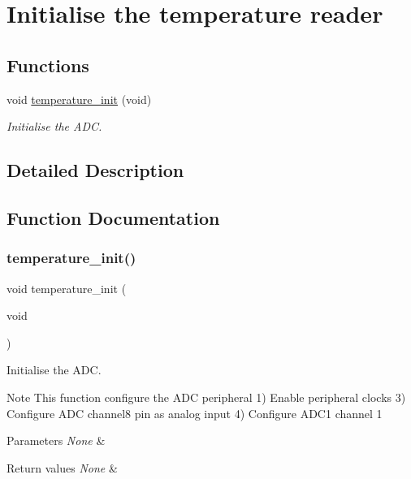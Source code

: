\hypertarget{group___temperature___init}{}\section{Initialise the temperature reader}
\label{group___temperature___init}
\subsection*{Functions}
\begin{DoxyCompactItemize}
\item 
void \hyperlink{group___temperature___init_ga7da890f6748bbeb05511fd20100cb6ef}{temperature\+\_\+init} (void)
\begin{DoxyCompactList}\small\item\em Initialise the A\+DC. \end{DoxyCompactList}\end{DoxyCompactItemize}


\subsection{Detailed Description}


\subsection{Function Documentation}
\mbox{\label{group___temperature___init_ga7da890f6748bbeb05511fd20100cb6ef}} 
\subsubsection{\texorpdfstring{temperature\+\_\+init()}{temperature\_init()}}
{\footnotesize\ttfamily void temperature\+\_\+init (\begin{DoxyParamCaption}\item[{void}]{ }\end{DoxyParamCaption})}



Initialise the A\+DC. 

\begin{DoxyNote}{Note}
This function configure the A\+DC peripheral 1) Enable peripheral clocks 3) Configure A\+DC channel8 pin as analog input 4) Configure A\+D\+C1 channel 1 
\end{DoxyNote}

\begin{DoxyParams}{Parameters}
{\em None} & \\
\hline
\end{DoxyParams}

\begin{DoxyRetVals}{Return values}
{\em None} & \\
\hline
\end{DoxyRetVals}

